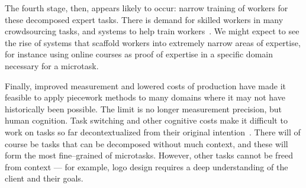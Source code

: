 \documentclass[pn4226]{subfiles}
\begin{document}
The fourth stage, then, appears likely to occur: narrow training of workers for these decomposed expert tasks. 
There is demand for skilled workers in many crowdsourcing tasks, and systems to help train workers~\cite{suzukiAtelier}. 
We might expect to see the rise of systems that scaffold workers into extremely narrow areas of expertise,
for instance using online courses as proof of expertise in a specific domain necessary for a microtask.

Finally, improved measurement and lowered costs of production have made it feasible to apply piecework methods to many domains where it may not have historically been possible.
The limit is no longer measurement precision, but human cognition. 
Task switching and other cognitive costs make it difficult
to work on tasks so far decontextualized from their original intention~\cite{delayAndOrderLasecki}.
There will of course be tasks that can be decomposed without much context,
and these will form the most fine--grained of microtasks.
However, other tasks cannot be freed from context
--- for example,
logo design requires a deep understanding of the client and their goals.
\end{document}
